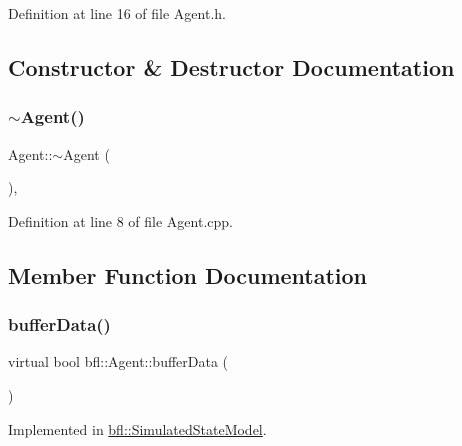 Definition at line 16 of file Agent.\+h.



\subsection{Constructor \& Destructor Documentation}
\mbox{\label{classbfl_1_1Agent_acb45ed3a6892a9a66fdb37ad8e883428}} 
\subsubsection{\texorpdfstring{$\sim$\+Agent()}{~Agent()}}
{\footnotesize\ttfamily Agent\+::$\sim$\+Agent (\begin{DoxyParamCaption}{ }\end{DoxyParamCaption})\hspace{0.3cm}{\ttfamily [virtual]}, {\ttfamily [noexcept]}}



Definition at line 8 of file Agent.\+cpp.



\subsection{Member Function Documentation}
\mbox{\label{classbfl_1_1Agent_aceb93f1712a98222af2b02537c09b6dc}} 
\subsubsection{\texorpdfstring{buffer\+Data()}{bufferData()}}
{\footnotesize\ttfamily virtual bool bfl\+::\+Agent\+::buffer\+Data (\begin{DoxyParamCaption}{ }\end{DoxyParamCaption})\hspace{0.3cm}{\ttfamily [pure virtual]}}



Implemented in \mbox{\hyperlink{classbfl_1_1SimulatedStateModel_ae7bc3a9bf9d4ed8a8d1985772380295e}{bfl\+::\+Simulated\+State\+Model}}.

\mbox{\label{classbfl_1_1Agent_a38522a865006e91ab426fe3bf3a6d4c8}} 
